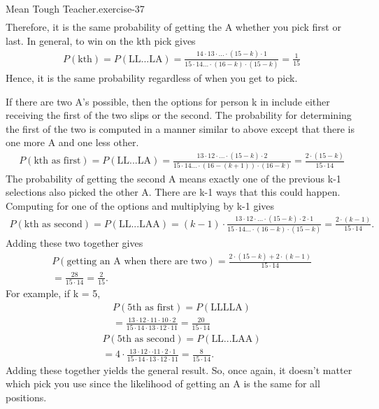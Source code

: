 \documentclass[10pt,]{book}
\numberwithin{equation}{section}
\begin{document}
\begin{inlineexercise}{Mean Tough Teacher.}{exercise-37}
\begin{gather*}
\end{gather*}
Therefore, it is the same probability of getting the A whether you pick first or last.  In general, to win on the kth pick gives%
\begin{gather*}
P(\text{kth}) = P(\text{LL...LA}) = \frac{14 \cdot 13 \cdot ... \cdot (15-k) \cdot 1}{15 \cdot 14 ... \cdot (16-k) \cdot (15-k)} = \frac{1}{15}
\end{gather*}
Hence, it is the same probability regardless of when you get to pick.%
\par
\hypertarget{p-618}{}%
If there are two A's possible, then the options for person k in include either receiving the first of the two slips or the second. The probability for determining the first of the two is computed in a manner similar to above except that there is one more A and one less other.%
\begin{gather*}
P(\text{kth as first}) = P(\text{LL...LA}) = \frac{13 \cdot 12 \cdot ... \cdot (15-k)  \cdot 2}{15 \cdot 14 ... \cdot (16-(k+1)) \cdot (16-k)} = \frac{2 \cdot (15-k)}{15 \cdot 14}
\end{gather*}
The probability of getting the second A means exactly one of the previous k-1 selections also picked the other A. There are k-1 ways that this could happen. Computing for one of the options and multiplying by k-1 gives%
\begin{gather*}
P(\text{kth as second}) = P(\text{LL...LAA}) = (k-1) \cdot \frac{13 \cdot 12 \cdot ... \cdot (15-k) \cdot 2 \cdot 1}{15 \cdot 14 ... \cdot (16-k) \cdot (15-k)} = \frac{2 \cdot (k-1)}{15 \cdot 14}.
\end{gather*}
Adding these two together gives%
\begin{gather*}
P(\text{getting an A when there are two}) = \frac{2 \cdot (15-k) + 2 \cdot (k-1)}{15 \cdot 14}\\
= \frac{28}{15 \cdot 14} = \frac{2}{15}.
\end{gather*}
For example, if k = 5,%
\begin{gather*}
P(\text{5th as first}) = P(\text{LLLLA}) \\
= \frac{13 \cdot 12 \cdot 11 \cdot 10  \cdot 2}{15 \cdot 14 \cdot 13 \cdot 12 \cdot 11} = \frac{20}{15 \cdot 14}
\end{gather*}
%
\begin{gather*}
P(\text{5th as second}) = P(\text{LL...LAA}) \\
= 4 \cdot \frac{13 \cdot 12 \cdot \cdot 11 \cdot 2 \cdot 1}{15 \cdot 14 \cdot 13 \cdot 12 \cdot 11} = \frac{8}{15 \cdot 14}.
\end{gather*}
Adding these together yields the general result. So, once again, it doesn't matter which pick you use since the likelihood of getting an A is the same for all positions.%
\end{inlineexercise}
\end{document}
